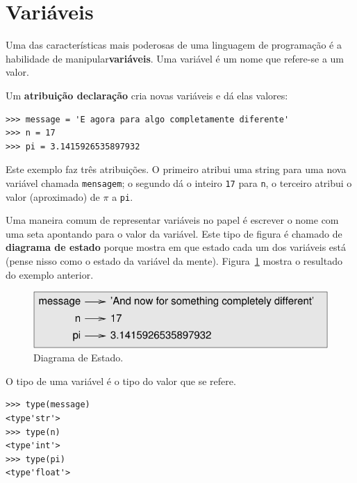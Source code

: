 \documentclass[10pt]{book}
\begin{document}
\section{Variáveis}
\label{variáveis}

Uma das características mais poderosas de uma linguagem de programação é a
habilidade de manipular ​​{\bf variáveis}. Uma variável é um nome que
refere-se a um valor.

Um {\bf atribuição declaração} cria novas variáveis ​​e dá
elas valores:

\begin{verbatim}
>>> message = 'E agora para algo completamente diferente'
>>> n = 17
>>> pi = 3.1415926535897932
\end{verbatim}
%
Este exemplo faz três atribuições. O primeiro atribui uma string
para uma nova variável chamada {\tt mensagem};
o segundo dá o inteiro {\tt 17} para {\tt n}, o terceiro
atribui o valor (aproximado) de $\pi$ a {\tt pi}.

Uma maneira comum de representar variáveis ​​no papel é escrever o nome com
uma seta apontando para o valor da variável. Este tipo de figura é
chamado de {\bf diagrama de estado} porque mostra em que estado cada um dos
variáveis ​​está (pense nisso como o estado da variável da mente).
Figura~\ref{fig.state2} mostra o resultado do exemplo anterior.

\begin{figure}
\centerline
{\includegraphics[scale=0.8] {figs/state2.pdf}}
\caption{Diagrama de Estado.}
\label{fig.state2}
\end{figure}

O tipo de uma variável é o tipo do valor que se refere.

\begin{verbatim}
>>> type(message)
<type'str'>
>>> type(n)
<type'int'>
>>> type(pi)
<type'float'>
\end{verbatim}
\end{document}
